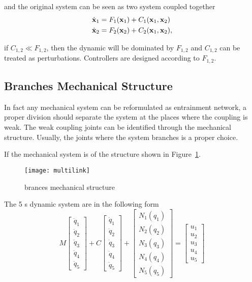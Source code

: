 {and the original system can be seen as two system coupled together
\begin{align}
\dot{\mathbf{x}}_1&=F_1(\mathbf{x}_1)+C_1(\mathbf{x}_1,\mathbf{x}_2)\nonumber\\
\dot{\mathbf{x}}_2&=F_2(\mathbf{x}_2)+C_2(\mathbf{x}_1,\mathbf{x}_2),\nonumber
\end{align}

if $C_{1,2} \ll F_{1,2}$, then the dynamic will be dominated by $F_{1,2}$ and $C_{1,2}$ can be treated as perturbations.
Controllers are designed according to $F_{1,2}$.

\subsection*{Branches Mechanical Structure}
In fact any mechanical system can be reformulated as entrainment network,
a proper division should separate the system at the places where the coupling is weak.
The weak coupling joints can be identified through the mechanical structure.
Usually, the joints where the system branches is a proper choice.

If the mechanical system is of  the structure shown in Figure~\ref{fig:brancefigure}.
\begin{figure}[!htbp]
  \begin{center}
      \texttt{[image: multilink]}
    \caption{brances mechanical structure}
    \label{fig:brancefigure}
\end{center}
\end{figure}

The  5 {\dof}s dynamic system are in the following form
\[
M\left[\begin{array}{c}
\ddot{q}_{1}\\
\ddot{q}_{2}\\
\ddot{q}_{3}\\
\ddot{q}_{4}\\
\ddot{q}_{5}\end{array}\right]+C\left[\begin{array}{c}
\dot{q}_{1}\\
\dot{q}_{2}\\
\dot{q}_{3}\\
\dot{q}_{4}\\
\dot{q}_{5}\end{array}\right]+\left[\begin{array}{c}
N_{1}(q_{1})\\
N_{2}(q_{2})\\
N_{3}(q_{3})\\
N_{4}(q_{4})\\
N_{5}(q_{5})\end{array}\right]=\left[\begin{array}{c}
u_{1}\\
u_{2}\\
u_{3}\\
u_{4}\\
u_{5}\end{array}\right]
\]

}
